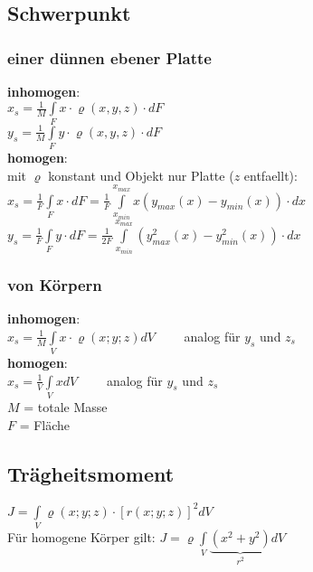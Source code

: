 \subsection{Schwerpunkt}
  \begin{multicols}{2}
    \subsubsection{einer dünnen ebener Platte}
      \textbf{inhomogen}:\\
        $x_s=\frac{1}{M} \int\limits_F x \cdot \varrho(x,y,z)\cdot dF$\\
        $y_s=\frac{1}{M} \int\limits_F y \cdot \varrho(x,y,z)\cdot dF$\\
      \textbf{homogen}:\\
        mit $\varrho$ konstant und Objekt nur Platte ($z$ entfaellt):\\
        $x_s=\frac{1}{F} \int\limits_F x\cdot dF = \frac{1}{F} \int\limits_{x_{min}}^{x_{max}}
        x(y_{max}(x)-y_{min}(x))\cdot dx$ \\
        $y_s=\frac{1}{F} \int\limits_F y\cdot dF = \frac{1}{2F} \int\limits_{x_{min}}^{x_{max}}
        (y_{max}^2(x)-y_{min}^2(x))\cdot dx$ \\
    \columnbreak
    
    \subsubsection{von Körpern}
      \textbf{inhomogen}: \\
        $x_s = \frac{1}{M}\int\limits_V x \cdot \varrho(x;y;z) dV \qquad$ analog für $y_s$ und $z_s$\\
      \textbf{homogen}: \\
        $x_s = \frac{1}{V}\int\limits_V x dV \qquad$ analog für $y_s$ und $z_s$\\
      
      $M$ = totale Masse\\
      $F$ = Fläche
  \end{multicols}
   
\subsection{Trägheitsmoment}
  $J = \int\limits_V \varrho(x;y;z) \cdot [r(x;y;z)]^2 dV$ \\
  Für homogene Körper gilt: $J = \varrho \int\limits_V \underbrace{(x^2+y^2)}_{r^2}dV$

